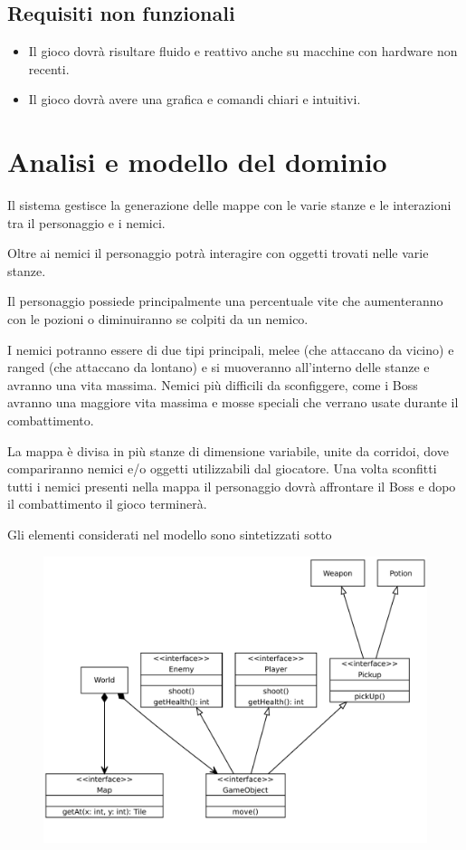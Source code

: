 \documentclass[a4paper,12pt]{report}
\begin{document}
    \subsection{Requisiti non funzionali}
    \begin{itemize}
        \item Il gioco dovrà risultare fluido e reattivo anche su macchine con hardware non recenti.
        \item Il gioco dovrà avere una grafica e comandi chiari e intuitivi.
    \end{itemize}
    \section{Analisi e modello del dominio}
    \par Il sistema gestisce la generazione delle mappe con le varie stanze e le interazioni tra il
    personaggio e i nemici.
    \par Oltre ai nemici il personaggio potrà interagire con oggetti trovati nelle varie stanze.
    \par Il personaggio possiede principalmente una percentuale vite che aumenteranno con le pozioni
    o diminuiranno se colpiti da un nemico.
    \par I nemici potranno essere di due tipi principali, melee (che attaccano da vicino) e ranged (che attaccano da lontano)
    e si muoveranno all'interno delle stanze e avranno una vita massima. Nemici più difficili da sconfiggere,
    come i Boss avranno una maggiore vita massima e mosse speciali che verrano usate durante il combattimento.
    \par La mappa è divisa in più stanze di dimensione variabile, unite da corridoi, dove compariranno nemici
    e/o oggetti utilizzabili dal giocatore.
    Una volta sconfitti tutti i nemici presenti nella mappa il personaggio dovrà affrontare il Boss e dopo il
    combattimento il gioco terminerà.
    \par \par Gli elementi considerati nel modello sono sintetizzati sotto
    \begin{figure}
        \includegraphics[width=\linewidth]{uml1}
    \end{figure}
\end{document}
